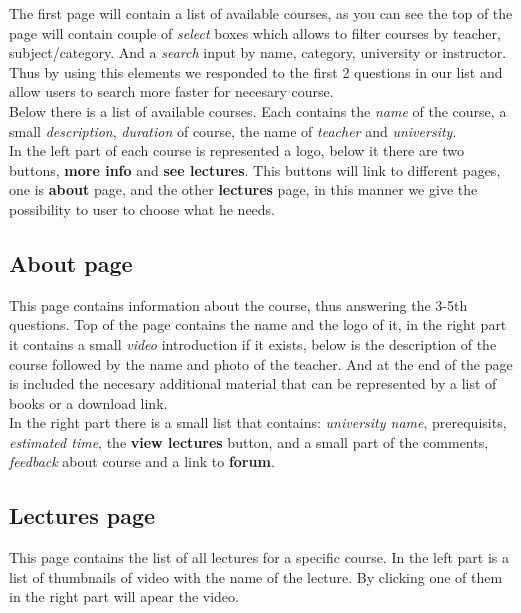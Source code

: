 \documentclass[12pt]{article}
\begin{document}
   The first page will contain a list of available courses, as you can see the
   top of the page will contain couple of \textit{select} boxes which allows to filter courses
  by teacher, subject/category. And a \textit{search} input by name, category, university or instructor. Thus by using
   this elements we responded to the first 2 questions in our list and allow users to search
   more faster for necesary course. \\

   Below there is a list of available courses. Each contains the \textit{name} of the course,
   a small \textit{description}, \textit{duration} of course,  the name of \textit{teacher}
   and \textit{university}. \\

   In the left part of each course is represented a logo, below it there are two buttons, \textbf{more info}
   and \textbf{see lectures}. This buttons will link to different pages, one is \textbf{about} page,
   and the other \textbf{lectures} page, in this manner we give the possibility to user to choose what he needs.

   \subsection{About page}

   This page contains information about the course, thus answering the 3-5th questions.
   Top of the page contains the name and the logo of it, in the right part it contains
   a small \textit{video} introduction if it exists, below is the description of the course
   followed by the name and photo of the teacher. And at the end of the page is included
   the necesary additional material that can be represented by a list of books or  a download link. \\

   In the right part there is a small list that contains: \textit{university name}, prerequisits,
   \textit{estimated time}, the \textbf{view lectures} button, and a small part of the comments,
   \textit{feedback} about course and a  link to \textbf{forum}.

   \subsection{Lectures page}

   This page contains the list of all lectures for a specific course. In the left part is a list
   of thumbnails of video with the name of the lecture. By clicking one of them in the right
   part will apear the video.
\end{document}
